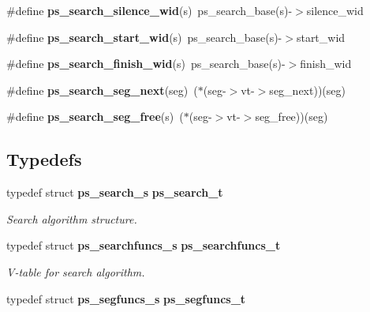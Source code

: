 \begin{DoxyCompactItemize}
\item 
\#define {\bfseries ps\-\_\-search\-\_\-silence\-\_\-wid}(s)~ps\-\_\-search\-\_\-base(s)-\/$>$silence\-\_\-wid\label{pocketsphinx__internal_8h_aab989bd93fe7abcc165bc92d6ccc1bac}

\item 
\#define {\bfseries ps\-\_\-search\-\_\-start\-\_\-wid}(s)~ps\-\_\-search\-\_\-base(s)-\/$>$start\-\_\-wid\label{pocketsphinx__internal_8h_a6dc7da2c1bc3bfb15d5fbe3618a4e3d4}

\item 
\#define {\bfseries ps\-\_\-search\-\_\-finish\-\_\-wid}(s)~ps\-\_\-search\-\_\-base(s)-\/$>$finish\-\_\-wid\label{pocketsphinx__internal_8h_aaeee657147579bc652c494989622f6b4}

\item 
\#define {\bfseries ps\-\_\-search\-\_\-seg\-\_\-next}(seg)~($\ast$(seg-\/$>$vt-\/$>$seg\-\_\-next))(seg)\label{pocketsphinx__internal_8h_ae7c150fad9fc9e8a13e632a1386b8f56}

\item 
\#define {\bfseries ps\-\_\-search\-\_\-seg\-\_\-free}(s)~($\ast$(seg-\/$>$vt-\/$>$seg\-\_\-free))(seg)\label{pocketsphinx__internal_8h_a38f6b225e3eace3793cdae8135b0aaab}

\end{DoxyCompactItemize}
\subsection*{\-Typedefs}
\begin{DoxyCompactItemize}
\item 
typedef struct {\bf ps\-\_\-search\-\_\-s} {\bf ps\-\_\-search\-\_\-t}\label{pocketsphinx__internal_8h_adc3de4d62e46c5e6cb93d09fb61be8ee}

\begin{DoxyCompactList}\small\item\em \-Search algorithm structure. \end{DoxyCompactList}\item 
typedef struct {\bf ps\-\_\-searchfuncs\-\_\-s} {\bf ps\-\_\-searchfuncs\-\_\-t}\label{pocketsphinx__internal_8h_a0eae078e32bd5f339792884c68aad8b3}

\begin{DoxyCompactList}\small\item\em \-V-\/table for search algorithm. \end{DoxyCompactList}\item 
typedef struct {\bf ps\-\_\-segfuncs\-\_\-s} {\bfseries ps\-\_\-segfuncs\-\_\-t}\label{pocketsphinx__internal_8h_a08187b85c6bc5b4991632dc78e237977}

\end{DoxyCompactItemize}
